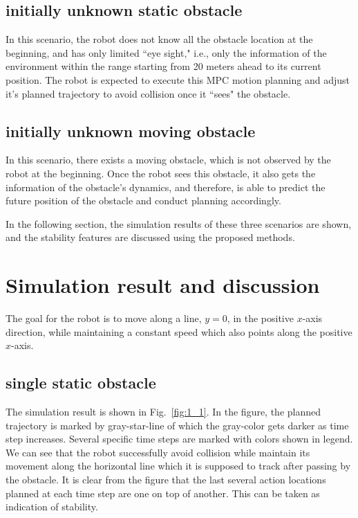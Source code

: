 \documentclass{ifacconf}
\begin{document}
\subsection{initially unknown static obstacle}
In this scenario, the robot does not know all the obstacle location at the beginning, and has only limited ``eye sight," i.e., only the information of the environment within the range starting from 20 meters ahead to its current position. The robot is expected to execute this MPC motion planning and adjust it's planned trajectory to avoid collision once it ``sees" the obstacle.

\subsection{initially unknown moving obstacle}
In this scenario, there exists a moving obstacle, which is not observed by the robot at the beginning. Once the robot sees this obstacle, it also gets the information of the obstacle's dynamics, and therefore, is able to predict the future position of the obstacle and conduct planning accordingly. 

In the following section, the simulation results of these three scenarios are shown, and the stability features are discussed using the proposed methods.



\section{Simulation result and discussion}

The goal for the robot is to move along a line, $y=0$, in the positive $x$-axis direction, while maintaining a constant speed which also points along the positive $x$-axis. 
\subsection{single static obstacle}
The simulation result is shown in Fig.~\ref{fig:1_1}. In the figure, the planned trajectory is marked by gray-star-line of which the gray-color gets darker as time step increases. Several specific time steps are marked with colors shown in legend. We can see that the robot successfully avoid collision while maintain its movement along the horizontal line which it is supposed to track after passing by the obstacle. It is clear from the figure that the last several action locations planned at each time step are one on top of another. This can be taken as indication of stability. 
\end{document}
